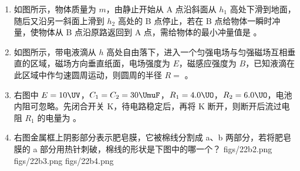 \documentclass[\gkver]{gaokaozhenti}
\begin{document}
\begin{enumerate}
{\begin{enumerate}
	\item

\end{enumerate}
}

\item
如图所示，物体质量为 $m$，由静止开始从 A 点沿斜面从 $h_{1}$ 高处下滑到地面，随后又沿另一斜面上滑到 $h_{2}$ 高处的 B 点停止，若在 B 点给物体一瞬时冲量，使物体从 B 点沿原路返回到 A 点，需给物体的最小冲量值是 。
\onepicture[align=right]{}

\item
如图所示，带电液滴从 $h$ 高处自由落下，进入一个匀强电场与匀强磁场互相垂直的区域，磁场方向垂直纸面，电场强度为 $E$，磁感应强度为 $B$，已知液滴在此区域中作匀速圆周运动，则圆周的半径 $R =$ 。
\onepicture[align=right]{}

\item
右图中 $E = 10\UV$，$C_{1} = C_{2} = 30\UmuF$，$R_{1} = 4.0\UO$，$R_{2} = 6.0\UO$，电池内阻可忽略。先闭合开关 K，待电路稳定后，再将 K 断开，则断开后流过电阻 $R_{1}$ 的电量为 。

\item
右图金属框上阴影部分表示肥皂膜，它被棉线分割成 a、b 两部分，若将肥皂膜的 a 部分用热针刺破，棉线的形状是下图中的哪一个？
\onepicture[align=right]{}
{figs/22b2.png}
{figs/22b3.png}
{figs/22b4.png}


\end{enumerate}
\end{document}
